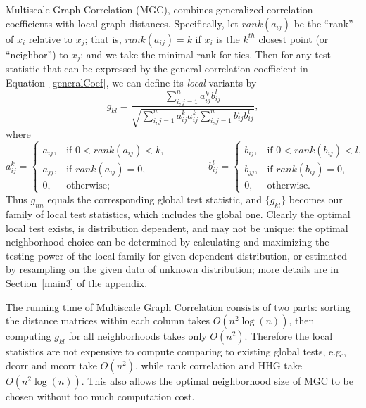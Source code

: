 \documentclass[11pt]{article}
\begin{document}
Multiscale Graph Correlation (MGC), combines generalized correlation coefficients with local graph distances.  Specifically, let $rank(a_{ij})$  be the ``rank'' of $x_i$ relative to $x_j$; that is, $rank(a_{ij})=k$ if $x_i$ is the $k^{th}$ closest point (or ``neighbor'') to $x_j$; and we take the minimal rank for ties.  Then for any test statistic that can be expressed by the general correlation coefficient in Equation~\ref{generalCoef}, we can define its \emph{local} variants by
\begin{equation}
\label{localCoef}
g_{kl}=\frac{\sum_{i,j=1}^n a_{ij}^k b_{ij}^l}{\sqrt{\sum_{i,j=1}^n  a_{ij}^{k} a_{ij}^{k} \sum_{i,j=1}^n b_{ij}^{l} b_{ij}^{l}}},
\end{equation}
where
\begin{equation}
    a_{ij}^k=
    \begin{cases}
      a_{ij}, & \text{if } 0 < rank(a_{ij}) < k, \\
			a_{jj}, & \text{if } rank(a_{ij}) =0, \\
      0, & \text{otherwise};
    \end{cases} \qquad \qquad
    b_{ij}^l=
    \begin{cases}
      b_{ij}, & \text{if } 0 < rank(b_{ij}) < l, \\
			b_{jj}, & \text{if } rank(b_{ij}) =0, \\
      0, & \text{otherwise}.
    \end{cases}
\end{equation}
Thus $g_{nn}$ equals the corresponding global test statistic, and $\{g_{kl}\}$ becomes our family of local test statistics, which includes the global one. Clearly the optimal local test exists, is distribution dependent, and may not be unique; the optimal neighborhood choice can be determined by calculating and maximizing the testing power of the local family for given dependent distribution, or estimated by resampling on the given data of unknown distribution; more details are in Section~\ref{main3} of the appendix.

The running time of Multiscale Graph Correlation consists of two parts: sorting the distance matrices within each column takes $O(n^2\log(n))$, then computing $g_{kl}$ for all neighborhoods takes only $O(n^2)$. Therefore the local statistics are not expensive to compute comparing to existing global tests, e.g., dcorr and mcorr take $O(n^2)$, while rank correlation and HHG take $O(n^2\log(n))$. This also allows the optimal neighborhood size of MGC to be chosen without too much computation cost.
\end{document}
